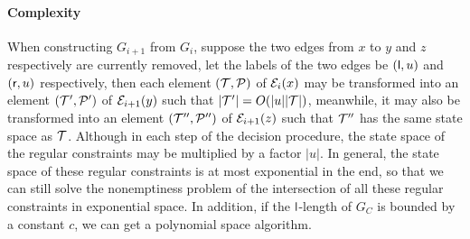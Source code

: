 \paragraph*{Complexity}
When constructing $G_{i+1}$ from $G_i$, suppose the two edges from $x$ to $y$ and $z$ respectively are currently removed, let the labels of the two edges be $({\sf l}, u)$ and $({\sf r}, u)$ respectively, then each element $(\mathcal{T}, \mathcal{P})$ of $\mathcal{E}_i(x)$ may be transformed into an element $(\mathcal{T}', \mathcal{P}')$ of $\mathcal{E}_{i+1}(y)$ such that $|\mathcal{T}'| = O(|u||\mathcal{T}|)$, meanwhile, it may also be transformed into an element $(\mathcal{T}'', \mathcal{P}'')$ of $\mathcal{E}_{i+1}(z)$ such that $\mathcal{T}''$ has the same state space as $\mathcal{T}$. Although in each step of the decision procedure, the state space of the regular constraints may be multiplied by a factor $|u|$. In general, the state space of these regular constraints is at most exponential in the end, so that we can still solve the nonemptiness problem of the intersection of all these regular constraints in exponential space. In addition, if the $\mathsf{l}$-length of $G_C$ is bounded by a constant $c$, we can get a polynomial space algorithm.


